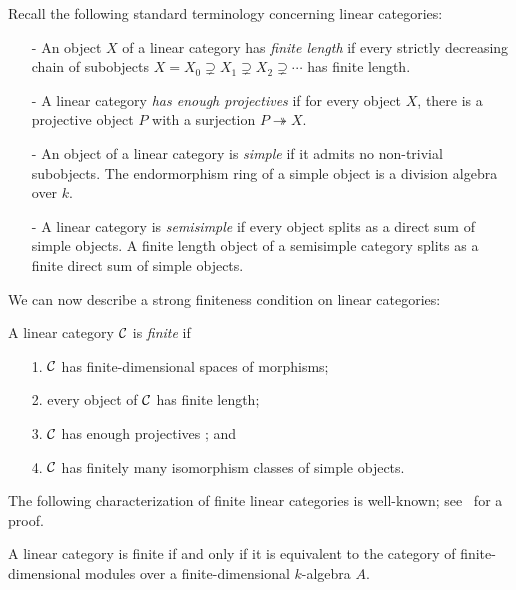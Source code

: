 \documentclass{amsart}
\begin{document}
Recall the following standard terminology concerning linear categories:
\begin{itemize}
	\item[-] An object $X$ of a linear category has {\em finite length} if every strictly decreasing chain of subobjects $X = X_0 \supsetneq X_1 \supsetneq X_2 \supsetneq  \cdots$ has finite length. 
	\item[-] A linear category {\em has enough projectives} if for every object $X$, there is a projective object $P$ with a surjection $P \twoheadrightarrow X$. 
	\item[-] An object of a linear category is {\em simple} if it admits no non-trivial subobjects. The endormorphism ring of a simple object is a division algebra over $k$. %
	\item[-] A linear category is {\em semisimple} if every object splits as a direct sum of simple objects.  A finite length object of a semisimple category splits as a finite direct sum of simple objects.  %
\end{itemize}

We can now describe a strong finiteness condition on linear categories:
\begin{definition} %
	A linear category $\mathcal C$ is {\em finite} if 
	\begin{enumerate}
		\item[1.] $\mathcal C$ has finite-dimensional spaces of morphisms;
		\item[2.] every object of $\mathcal C$ has finite length;
		\item[3.] $\mathcal C$ has enough projectives%
		; and
		\item[4.] $\mathcal C$ has finitely many isomorphism classes of simple objects.  
	\end{enumerate}
\end{definition}

The following characterization of finite linear categories is well-known; see~\cite{BTP} for a proof.
\begin{proposition} \label{prop:catismod}
A linear category is finite if and only if it is equivalent to the category of finite-dimensional modules over a finite-dimensional $k$-algebra $A$.
\end{proposition}
\end{document}
